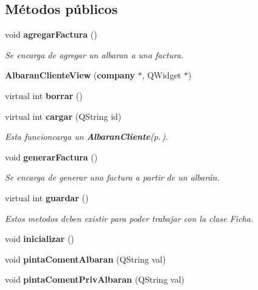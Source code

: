 \subsection*{M\'{e}todos p\'{u}blicos}
\begin{CompactItemize}
\item 
void {\bf agregar\-Factura} ()
\begin{CompactList}\small\item\em Se encarga de agregar un albaran a una factura. \item\end{CompactList}\item 
{\bf Albaran\-Cliente\-View} ({\bf company} $\ast$, QWidget $\ast$)\label{classAlbaranClienteView_a1}

\item 
virtual int {\bf borrar} ()\label{classAlbaranClienteView_a2}

\item 
virtual int {\bf cargar} (QString id)\label{classAlbaranClienteView_a3}

\begin{CompactList}\small\item\em Esta funcioncarga un {\bf Albaran\-Cliente}{\rm (p.\,\pageref{classAlbaranCliente})}. \item\end{CompactList}\item 
void {\bf generar\-Factura} ()
\begin{CompactList}\small\item\em Se encarga de generar una factura a partir de un albar\'{a}n. \item\end{CompactList}\item 
virtual int {\bf guardar} ()
\begin{CompactList}\small\item\em Estos metodos deben existir para poder trabajar con la clase Ficha. \item\end{CompactList}\item 
void {\bf inicializar} ()\label{classAlbaranClienteView_a6}

\item 
void {\bf pinta\-Coment\-Albaran} (QString val)\label{classAlbaranClienteView_a7}

\item 
void {\bf pinta\-Coment\-Priv\-Albaran} (QString val)\label{classAlbaranClienteView_a8}


\end{CompactItemize}
